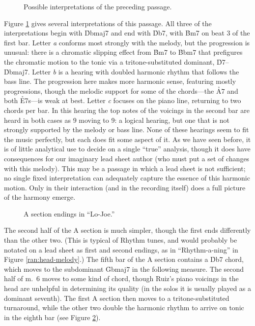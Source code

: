 \begin{figure}[tbp]
  \caption[Possible interpretations of the third and fourth bars of the A
  sections.]{%
    Possible interpretations of the preceding passage.}
  \label{lj:third-fourth-analyses}
\end{figure}

Figure \ref{lj:third-fourth-analyses} gives several interpretations of this
passage. All three of the interpretations begin with \h{Dbmaj7} and end with
\h{Db7}, with \h{Bm7} on beat 3 of the first bar. Letter \emph{a} conforms
most strongly with the melody, but the progression is unusual: there is a
chromatic slipping effect from \h{Bm7} to \h{Bbm7} that prefigures the
chromatic motion to the tonic via a tritone-substituted dominant,
\h{D7}--\h{Dbmaj7}. Letter \emph{b} is a hearing with doubled harmonic rhythm
that follows the bass line. The progression here makes more harmonic sense,
featuring mostly \tf progressions, though the melodic support for some of the
chords---the \h{A7} and both \h{E7}s---is weak at best. Letter \emph{c}
focuses on the piano line, returning to two chords per bar. In this hearing
the top notes of the voicings in the second bar are heard in both cases as
\sharp{}9 moving to \flat{}9: a logical hearing, but one that is not strongly
supported by the melody or bass line. None of these hearings seem to fit the
music perfectly, but each does fit some aspect of it. As we have seen before,
it is of little analytical use to decide on a single ``true'' analysis, though
it does have consequences for our imaginary lead sheet author (who must put a
set of changes with this melody). This may be a passage in which a lead sheet
is not sufficient; no single fixed interpretation can adequately capture the
essence of this harmonic motion. Only in their interaction (and in the
recording itself) does a full picture of the harmony emerge.

\begin{figure}[tbp]
  \caption{A section endings in ``Lo-Joe.''}
  \label{lj:a-sect-endings}
\end{figure}

The second half of the A section is much simpler, though the first ends
differently than the other two. (This is typical of Rhythm tunes, and would
probably be notated on a lead sheet as first and second endings, as in
``Rhythm-a-ning'' in Figure \ref{ran:head-melody}.) The fifth bar of the A
section contains a \h{Db7} chord, which moves to the subdominant \h{Gbmaj7} in
the following measure. The second half of m.~6 moves to some kind of \Cflat
chord, though Ruiz's piano voicings in the head are unhelpful in determining
its quality (in the solos it is usually played as a dominant seventh). The
first A section then moves to a tritone-substituted turnaround, while the
other two double the harmonic rhythm to arrive on tonic in the eighth bar
(see Figure \ref{lj:a-sect-endings}).


